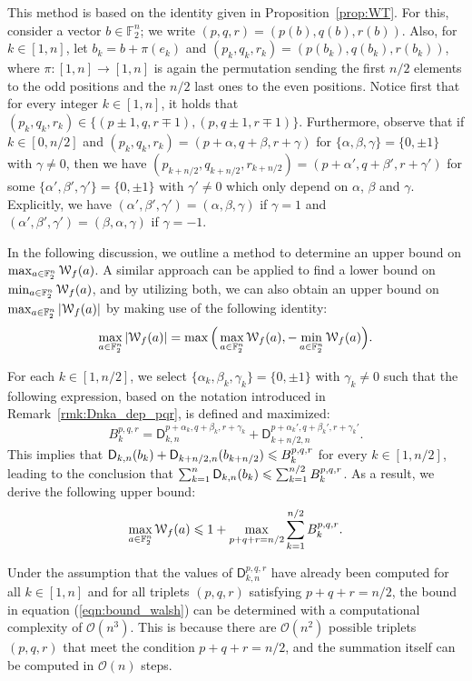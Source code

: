 \documentclass{llncs}
\begin{document}
This method is based on the identity given in Proposition~\ref{prop:WT}.
For this, consider a vector $b\in\mathbb F_2^n$; we write $(p,q,r)=(p(b),q(b),r(b))$. Also, for $k\in[1,n]$, let $b_k=b+\pi(e_k)$ and $(p_k,q_k,r_k)=(p(b_k),q(b_k),r(b_k))$, where $\pi:[1,n]\to[1,n]$ is again the permutation sending the first $n/2$ elements to the odd positions and the $n/2$ last ones to the even positions. Notice first that for every integer $k\in[1,n]$, it holds that $(p_k,q_k,r_k)\in\{(p\pm1,q,r\mp 1),(p,q\pm 1,r\mp 1)\}$. Furthermore, observe that if $k\in[0,n/2]$ and $(p_k,q_k,r_k)=(p+\alpha,q+\beta,r+\gamma)$ for $\{\alpha,\beta,\gamma\}=\{0,\pm 1\}$ with $\gamma\neq 0$, then we have $(p_{k+n/2},q_{k+n/2},r_{k+n/2})=(p+\alpha',q+\beta',r+\gamma')$ for some $\{\alpha',\beta',\gamma'\}=\{0,\pm 1\}$ with $\gamma'\neq 0$ which only depend on $\alpha$, $\beta$ and $\gamma$. Explicitly, we have $(\alpha',\beta',\gamma')=(\alpha,\beta,\gamma)$ if $\gamma=1$ and $(\alpha',\beta',\gamma')=(\beta,\alpha,\gamma)$ if $\gamma=-1$.

In the following discussion, we outline a method to determine an upper bound on $\max_{a\in\F_2^n}\wt f(a)$. A similar approach can be applied to find a lower bound on $\min_{a\in\F_2^n}\wt f(a)$, and by utilizing both, we can also obtain an upper bound on $\max_{a\in\F_2^n}|\wt f(a)|$ by making use of the following identity:
\[
	\max_{a\in\F_2^n}|\wt f(a)|=\max\Big(\max_{a\in\F_2^n}\wt f(a),-\min_{a\in\F_2^n}\wt f(a)\Big).
\]

For each $k\in[1,n/2]$, we select $\{\alpha_k,\beta_k,\gamma_k\}=\{0,\pm 1\}$ with $\gamma_k\neq 0$ such that the following expression, based on the notation introduced in Remark~\ref{rmk:Dnka_dep_pqr}, is defined and maximized:
\[
	B_k^{p,q,r}=\mathsf D_{k,n}^{p+\alpha_k,q+\beta_k,r+\gamma_k}+\mathsf D_{k+n/2,n}^{p+\alpha_k',q+\beta_k',r+\gamma_k'}.
\]
This implies that $\Dnka{n}{k}{b_k}+\Dnka{n}{k+n/2}{b_{k+n/2}}\leq B_k^{p,q,r}$ for every $k\in[1,n/2]$, leading to the conclusion that $\sum_{k=1}^n\Dnka nk{b_k}\leq\sum_{k=1}^{n/2} B_k^{p,q,r}$. As a result, we derive the following upper bound:
\begin{equation}\label{eqn:bound_walsh}
	\max_{a\in\F_2^n}\wt f(a)\leq 1+\max_{p+q+r=n/2}\sum_{k=1}^{n/2} B_k^{p,q,r}.
\end{equation}

Under the assumption that the values of $\mathsf{D}_{k,n}^{p,q,r}$ have already been computed for all $k\in[1,n]$ and for all triplets $(p,q,r)$ satisfying $p+q+r=n/2$, the bound in equation (\ref{eqn:bound_walsh}) can be determined with a computational complexity of $\mathcal{O}(n^3)$. This is because there are $\mathcal{O}(n^2)$ possible triplets $(p,q,r)$ that meet the condition $p+q+r=n/2$, and the summation itself can be computed in $\mathcal{O}(n)$ steps.
\end{document}
